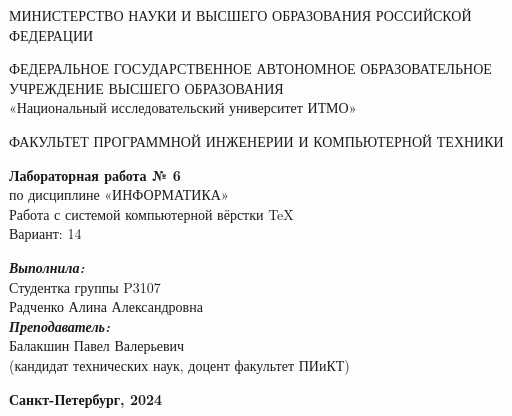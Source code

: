 \documentclass[a4paper, 12pt]{article}
\begin{document}
\thispagestyle{empty}
\begin{center}
    МИНИСТЕРСТВО НАУКИ И ВЫСШЕГО ОБРАЗОВАНИЯ РОССИЙСКОЙ ФЕДЕРАЦИИ

    \vspace{1em}
    ФЕДЕРАЛЬНОЕ ГОСУДАРСТВЕННОЕ АВТОНОМНОЕ ОБРАЗОВАТЕЛЬНОЕ УЧРЕЖДЕНИЕ ВЫСШЕГО ОБРАЗОВАНИЯ\\
    «Национальный исследовательский университет ИТМО»

    \vspace{10em}
    ФАКУЛЬТЕТ ПРОГРАММНОЙ ИНЖЕНЕРИИ И КОМПЬЮТЕРНОЙ ТЕХНИКИ

    \vspace{12em}
    
    {\Large \textbf{Лабораторная работа № 6}}\\[1em]
    {\Large по дисциплине «ИНФОРМАТИКА»}\\[1em]
    {Работа с системой компьютерной вёрстки \TeX}\\[1em]
    Вариант:  14
\end{center}

\vspace{10em}

\begin{flushright}
    \textbf{\textit{Выполнила:}} \\
    Студентка группы P3107 \\
    Радченко Алина Александровна\\
    \textbf{\textit{Преподаватель:}} \\
    Балакшин Павел Валерьевич \\
    (кандидат технических наук, доцент факультет ПИиКТ)
\end{flushright}
\vspace{6em}

\begin{center}
\textbf{Санкт-Петербург, 2024}
\end{center}
\end{document}

